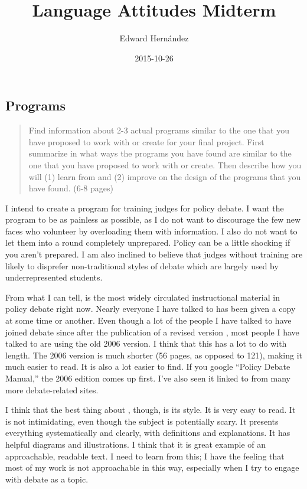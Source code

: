 \documentclass[man,12pt,natbib]{apa6}
\begin{document}
\title{Language Attitudes Midterm}
\author{Edward Hern\'{a}ndez}
\date{2015-10-26}
\maketitle

\subsection{Programs}
\begin{quote}
	Find information about 2-3 actual programs similar to the one that you have
	proposed to work with or create for your final project. First summarize in
	what ways the programs you have found are similar to the one that you have
	proposed to work with or create. Then describe how you will (1) learn from
	and (2) improve on the design of the programs that you have found. 
	(6-8 pages)
\end{quote}

I intend to create a program for training judges for policy debate.
I want the program to be as painless as possible, as I do not want to
discourage the few new faces who volunteer by overloading them with
information.
I also do not want to let them into a round completely unprepared. Policy can
be a little shocking if you aren't prepared. I am also inclined to believe that
judges without training are likely to disprefer non-traditional styles of
debate which are largely used by underrepresented students.

From what I can tell, \citet{Bellon06} is the most widely circulated
instructional material in policy debate right now. Nearly everyone I have
talked to has been given a copy at some time or another. Even though a lot of
the people I have talked to have joined debate since after the publication of a
revised version \citep{Bellon08}, most people I have talked to are using the
old 2006 version. I think that this has a lot to do with length. The 2006
version is much shorter (56 pages, as opposed to 121), making it much easier to
read.  It is also a lot easier to find. If you google ``Policy Debate Manual,''
the 2006 edition comes up first. I've also seen it linked to from many more
debate-related sites.

I think that the best thing about \citet{Bellon06}, though, is its style. It is
very easy to read. It is not intimidating, even though the subject is
potentially scary. It presents everything systematically and clearly, with
definitions and explanations. It has helpful diagrams and illustrations. I
think that it is great example of an approachable, readable text. I need to
learn from this; I have the feeling that most of my work is not approachable in
this way, especially when I try to engage with debate as a topic.
\end{document}
